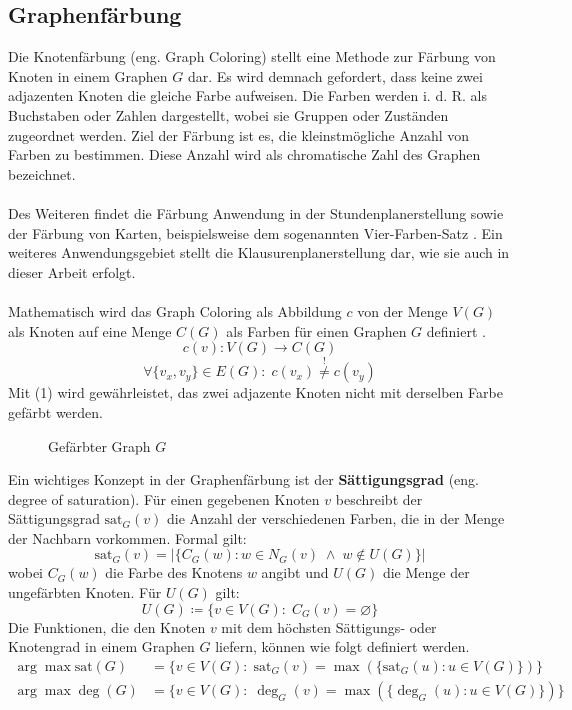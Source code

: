 \subsection{Graphenfärbung}
Die Knotenfärbung (eng. Graph Coloring) stellt eine Methode zur Färbung von Knoten in einem Graphen $G$ dar. 
Es wird demnach gefordert, dass keine zwei adjazenten Knoten die gleiche Farbe aufweisen.
Die Farben werden i. d. R. als Buchstaben oder Zahlen dargestellt, wobei sie Gruppen oder Zuständen zugeordnet werden.
Ziel der Färbung ist es, die kleinstmögliche Anzahl von Farben zu bestimmen.
Diese Anzahl wird als chromatische Zahl des Graphen bezeichnet.\\\\
Des Weiteren findet die Färbung Anwendung in der Stundenplanerstellung sowie der Färbung von Karten, beispielsweise dem sogenannten Vier-Farben-Satz \parencite{LdM_2017_VFS}.
Ein weiteres Anwendungsgebiet stellt die Klausurenplanerstellung dar, wie sie auch in dieser Arbeit erfolgt.\\\\
\newpage
\noindent Mathematisch wird das Graph Coloring als Abbildung $c$ von der Menge $V(G)$ als Knoten auf eine Menge $C(G)$ als Farben für einen Graphen $G$ definiert \parencite[121]{Diestel2017-bj}.
\begin{equation*}
c(v): V(G) \rightarrow C(G)
\end{equation*}
\begin{equation}
\forall \{v_x,v_y\} \in E(G) \colon \; c(v_x) \overset{!}{\neq} c(v_y)
\end{equation}
Mit (1) wird gewährleistet, das zwei adjazente Knoten nicht mit derselben Farbe gefärbt werden.
\vspace{-2.25cm}
\begin{figure}[H]
    \centering
    
    \vspace{-2cm}
    \caption{Gefärbter Graph $G$}
\end{figure}
\noindent Ein wichtiges Konzept in der Graphenfärbung ist der \textbf{Sättigungsgrad} (eng. degree of saturation). 
Für einen gegebenen Knoten $v$ beschreibt der Sättigungsgrad $\text{sat}_G(v)$ die Anzahl der verschiedenen Farben, die in der Menge der Nachbarn vorkommen\parencite[39]{lewis2021guide}. Formal gilt: 
\begin{equation*}
    \text{sat}_G(v)=|\{C_G(w)\colon w \in N_G(v) \; \wedge \; w \notin U(G)\}|
\end{equation*}
wobei $C_G(w)$ die Farbe des Knotens $w$ angibt und $U(G)$ die Menge der ungefärbten Knoten. Für $U(G)$ gilt:
\begin{equation*}
    U(G)\coloneqq \{v \in V(G) \colon \;C_G(v) = \varnothing\}
\end{equation*}
Die Funktionen, die den Knoten $v$ mit dem höchsten Sättigungs- oder Knotengrad in einem Graphen $G$ liefern, können wie folgt definiert werden.
\begin{align*}
    \arg \max \text{sat}(G) &= \{v \in V(G) \colon \; \text{sat}_G(v) = \max(\{\text{sat}_G(u) \colon u \in V(G) \})\}\\
    \arg \max \deg(G) &= \{v \in V(G)\colon \; \deg_G(v) = \max(\{\deg_G(u) \colon u \in V(G)\}) \}
\end{align*}
